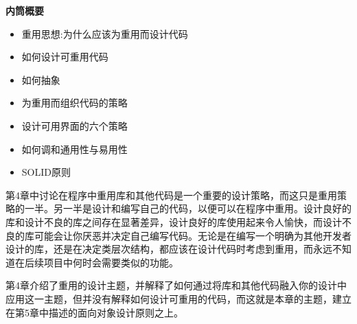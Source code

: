 \noindent
\textbf{内筒概要}

\begin{itemize}
\item
重用思想:为什么应该为重用而设计代码

\item
如何设计可重用代码

\item
如何抽象

\item
为重用而组织代码的策略

\item
设计可用界面的六个策略

\item
如何调和通用性与易用性

\item
SOLID原则
\end{itemize}

第4章中讨论在程序中重用库和其他代码是一个重要的设计策略，而这只是重用策略的一半。另一半是设计和编写自己的代码，以便可以在程序中重用。设计良好的库和设计不良的库之间存在显著差异，设计良好的库使用起来令人愉快，而设计不良的库可能会让你厌恶并决定自己编写代码。无论是在编写一个明确为其他开发者设计的库，还是在决定类层次结构，都应该在设计代码时考虑到重用，而永远不知道在后续项目中何时会需要类似的功能。

第4章介绍了重用的设计主题，并解释了如何通过将库和其他代码融入你的设计中应用这一主题，但并没有解释如何设计可重用的代码，而这就是本章的主题，建立在第5章中描述的面向对象设计原则之上。

